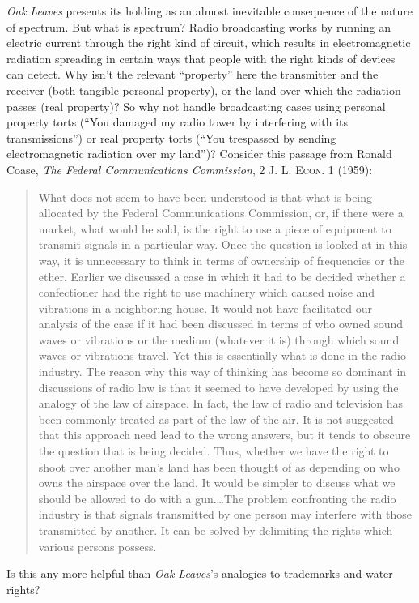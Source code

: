 \item \textit{Oak Leaves} presents its holding as an almost inevitable
consequence of the nature of spectrum. But what is spectrum? Radio broadcasting
works by running an electric current through the right kind of circuit, which
results in electromagnetic radiation spreading in certain ways that people with
the right kinds of devices can detect. Why isn't the relevant ``property'' here
the transmitter and the receiver (both tangible personal property), or the land
over which the radiation passes (real property)?  So why not handle
broadcasting cases using personal property torts (``You damaged my radio tower
by interfering with its transmissions'') or real property torts (``You
trespassed by sending electromagnetic radiation over my land'')? Consider this
passage from Ronald Coase, \textit{The Federal Communications Commission}, 2
\textsc{J. L. Econ.} 1 (1959):
\begin{quote}
What does not seem to have been understood is that what is being allocated by
the Federal Communications Commission, or, if there were a market, what would
be sold, is the right to use a piece of equipment to transmit signals in a
particular way. Once the question is looked at in this way, it is unnecessary
to think in terms of ownership of frequencies or the ether. Earlier we
discussed a case in which it had to be decided whether a confectioner had the
right to use machinery which caused noise and vibrations in a neighboring
house. It would not have facilitated our analysis of the case if it had been
discussed in terms of who owned sound waves or vibrations or the medium
(whatever it is) through which sound waves or vibrations travel. Yet this is
essentially what is done in the radio industry. The reason why this way of
thinking has become so dominant in discussions of radio law is that it seemed
to have developed by using the analogy of the law of airspace. In fact, the law
of radio and television has been commonly treated as part of the law of the
air. It is not suggested that this approach need lead to the wrong answers, but
it tends to obscure the question that is being decided. Thus, whether we have
the right to shoot over another man's land has been thought of as depending on
who owns the airspace over the land.  It would be simpler to discuss what we
should be allowed to do with a gun.\ldots The problem confronting the radio
industry is that signals transmitted by one person may interfere with those
transmitted by another. It can be solved by delimiting the rights which various
persons possess.
\end{quote}
Is this any more helpful than \textit{Oak Leaves}{}'s analogies to trademarks
and water rights?

